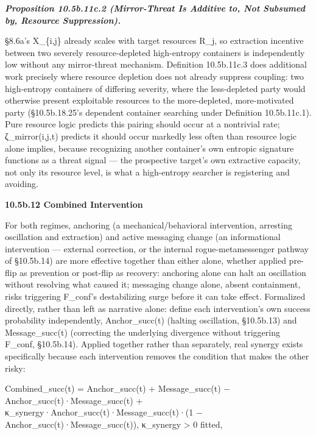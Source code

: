 \documentclass[
]{article}
\begin{document}
\emph{\textbf{Proposition 10.5b.11c.2 (Mirror-Threat Is Additive to, Not
Subsumed by, Resource Suppression).}}

§8.6a's X\_\{i,j\} already scales with target resources R\_j, so
extraction incentive between two severely resource-depleted high-entropy
containers is independently low without any mirror-threat mechanism.
Definition 10.5b.11c.3 does additional work precisely where resource
depletion does not already suppress coupling: two high-entropy
containers of differing severity, where the less-depleted party would
otherwise present exploitable resources to the more-depleted,
more-motivated party (§10.5b.18.25's dependent container searching under
Definition 10.5b.11c.1). Pure resource logic predicts this pairing
should occur at a nontrivial rate; ζ\_mirror(i,j,t) predicts it should
occur markedly less often than resource logic alone implies, because
recognizing another container's own entropic signature functions as a
threat signal --- the prospective target's own extractive capacity, not
only its resource level, is what a high-entropy searcher is registering
and avoiding.

\textbf{10.5b.12 Combined Intervention}

For both regimes, anchoring (a mechanical/behavioral intervention,
arresting oscillation and extraction) and active messaging change (an
informational intervention --- external correction, or the internal
rogue-metamessenger pathway of §10.5b.14) are more effective together
than either alone, whether applied pre-flip as prevention or post-flip
as recovery: anchoring alone can halt an oscillation without resolving
what caused it; messaging change alone, absent containment, risks
triggering F\_conf's destabilizing surge before it can take effect.
Formalized directly, rather than left as narrative alone: define each
intervention's own success probability independently, Anchor\_succ(t)
(halting oscillation, §10.5b.13) and Message\_succ(t) (correcting the
underlying divergence without triggering F\_conf, §10.5b.14). Applied
together rather than separately, real synergy exists specifically
because each intervention removes the condition that makes the other
risky:

Combined\_succ(t) = Anchor\_succ(t) + Message\_succ(t) −
Anchor\_succ(t)·Message\_succ(t) +
κ\_synergy·Anchor\_succ(t)·Message\_succ(t)·(1 −
Anchor\_succ(t)·Message\_succ(t)), κ\_synergy \textgreater{} 0 fitted,
\end{document}
